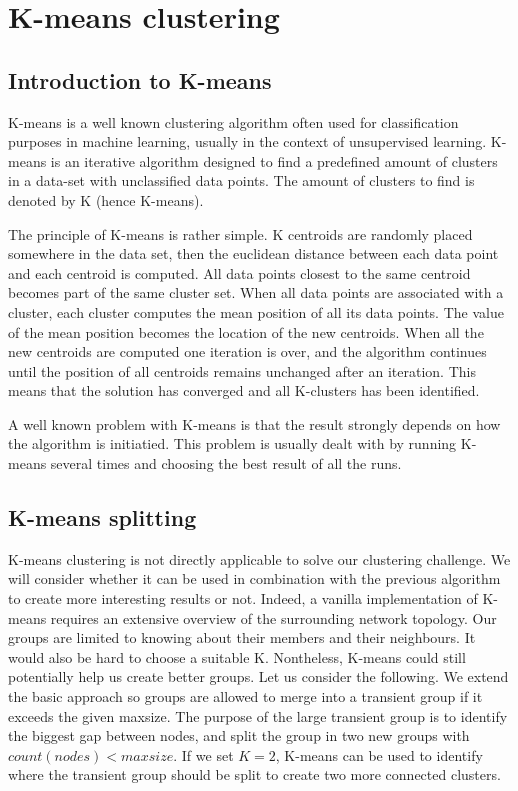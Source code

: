 
\section{K-means clustering}
\subsection{Introduction to K-means}
K-means is a well known clustering algorithm often used for classification purposes in machine learning, usually in the context of unsupervised learning. K-means
is an iterative algorithm designed to find a predefined amount of clusters in a data-set with unclassified data points. The amount of clusters to find is denoted by
K (hence K-means). 

The principle of K-means is rather simple. K centroids are randomly placed somewhere in the data set, then the euclidean distance between each data point and each centroid is computed. All data points
closest to the same centroid becomes part of the same cluster set. When all data points are associated with a cluster, each cluster computes the mean position of all its data points.
The value of the mean position becomes the location of the new centroids. When all the new centroids are computed
one iteration is over, and the algorithm continues until the position of all centroids remains unchanged after an iteration. This means that the solution has converged and all K-clusters has been identified. 

A well known problem with K-means is that the result strongly depends on how the algorithm is initiatied. This problem is usually dealt with by running K-means several times and choosing the best result of all the runs. 

\subsection{K-means splitting}
K-means clustering is not directly applicable to solve our clustering challenge. We will consider whether it can be used in combination with the previous algorithm to create 
more interesting results or not. Indeed, a vanilla implementation of K-means requires an extensive overview of the surrounding network topology. Our groups are limited to knowing about their members
and their neighbours. It would also be hard to choose a suitable K. Nontheless, K-means could still potentially help us create better groups. Let us consider the following. We extend the basic approach
so groups are allowed to merge into a transient group if it exceeds the given maxsize. The purpose of the large transient group is to identify the biggest gap between nodes, and split the group in two new
groups with $count(nodes) < maxsize$. If we set $K=2$, K-means can be used to identify where the transient group should be split to create two more connected clusters. 

